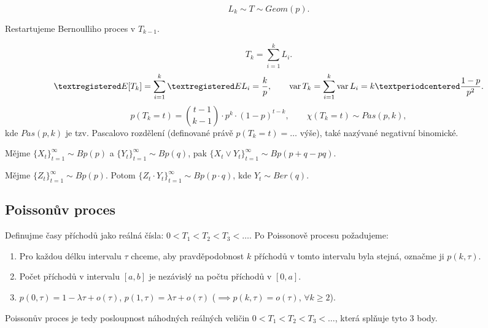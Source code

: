 \documentclass[12pt]{article}					%
\begin{document}
\begin{dusledek}
	$$ L_k \sim T \sim Geom(p). $$

	\begin{dukazin}
		Restartujeme Bernoulliho proces v $T_{k - 1}$.
	\end{dukazin}
\end{dusledek}

\begin{dusledek}
	$$ T_k = \sum_{i = 1}^k L_i. $$
	$$ ®E [T_k] = \sum_{i=1}^k ®E L_i = \frac{k}{p}, \qquad \var T_k = \sum_{i=1}^k \var L_i = k·\frac{1 - p}{p^2}. $$
	$$ p(T_k = t) = \binom{t - 1}{k - 1}·p^k·(1 - p)^{t - k}, \qquad \chi(T_k = t) \sim Pas(p, k), $$
	kde $Pas(p, k)$ je tzv. Pascalovo rozdělení (definované právě $p(T_k = t) = …$ výše), také nazývané negativní binomické.
\end{dusledek}

\begin{veta}
	Mějme $\{X_t\}_{t=1}^∞ \sim Bp(p)$ a $\{Y_t\}_{t=1}^∞ \sim Bp(q)$, pak $\{X_t \lor Y_t\}_{t=1}^∞ \sim Bp(p + q - pq)$.
\end{veta}

\begin{veta}
	Mějme $\{Z_t\}_{t = 1}^∞ \sim Bp(p)$. Potom $\{Z_t · Y_t\}_{t=1}^∞ \sim Bp(p·q)$, kde $Y_t \sim Ber(q)$.
\end{veta}

\subsection{Poissonův proces}

\begin{definice}
	Definujme časy příchodů jako reálná čísla: $0 < T_1 < T_2 < T_3 < …$. Po Poissonově procesu požadujeme:

	\begin{enumerate}
		\item Pro každou délku intervalu $\tau$ chceme, aby pravděpodobnost $k$ příchodů v tomto intervalu byla stejná, označme ji $p(k, \tau)$.
		\item Počet příchodů v intervalu $[a, b]$ je nezávislý na počtu příchodů v $[0, a]$.
		\item $p(0, \tau) = 1 - \lambda \tau + o(\tau)$, $p(1, \tau) = \lambda \tau + o(\tau)$ ($\implies p(k, \tau) = o(\tau)$, $\forall k ≥ 2$).
	\end{enumerate}

	Poissonův proces je tedy posloupnost náhodných reálných veličin $0 < T_1 < T_2 < T_3 < …$, která splňuje tyto 3 body.
\end{definice}
\end{document}
